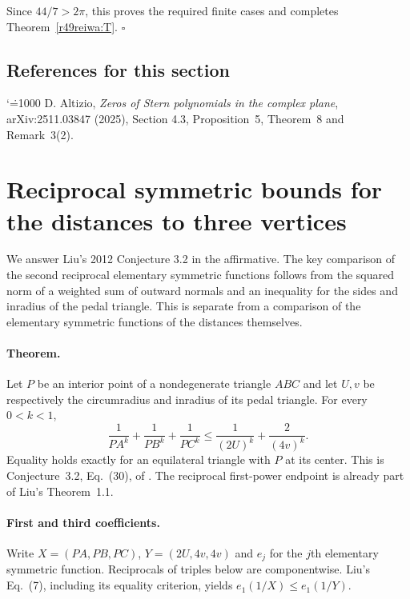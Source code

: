 \documentclass[11pt,a4paper]{article}
\makeatletter
\numberwithin{equation}{section}
\theoremstyle{definition}
\theoremstyle{remark}
\newenvironment{sectionabstract}{\par\smallskip\begingroup\small\noindent}{\par\endgroup\medskip}
\renewenvironment{thebibliography}[1]
 {\subsection*{References for this section}\small
  \list{\@biblabel{\@arabic\c@enumiv}}
       {\settowidth\labelwidth{\@biblabel{#1}}\leftmargin\labelwidth
        \advance\leftmargin\labelsep\@openbib@code
        \usecounter{enumiv}\let\p@enumiv\@empty
        \renewcommand\theenumiv{\@arabic\c@enumiv}}
  \sloppy\clubpenalty4000\widowpenalty4000\sfcode`\.=1000\relax}
 {\def\@noitemerr{\@latex@warning{Empty bibliography}}\endlist}
\makeatother
\begin{document}
Since \(44/7>2\pi\), this proves the required finite cases and completes Theorem~\ref{r49reiwa:T}. \hfill\(\square\)

\begin{thebibliography}{1}
 D. Altizio, \emph{Zeros of Stern polynomials in the complex plane}, arXiv:2511.03847 (2025), Section 4.3, Proposition~5, Theorem~8 and Remark~3(2).
\end{thebibliography}

\par\endgroup

\begingroup

\section{\texorpdfstring{Reciprocal symmetric bounds for the distances to three vertices}{Reciprocal symmetric bounds for the distances to three vertices}}\label{section:r50meiji}
\par\medskip

\begin{sectionabstract}
We answer Liu's 2012 Conjecture 3.2 in the affirmative. The key comparison of the second reciprocal elementary symmetric functions follows from the squared norm of a weighted sum of outward normals and an inequality for the sides and inradius of the pedal triangle. This is separate from a comparison of the elementary symmetric functions of the distances themselves.
\end{sectionabstract}
\paragraph{Theorem.}
Let $P$ be an interior point of a nondegenerate triangle $ABC$ and let $U,v$ be respectively the circumradius and inradius of its pedal triangle. For every $0<k<1$,
\[
 \frac1{PA^k}+\frac1{PB^k}+\frac1{PC^k}
 \le\frac1{(2U)^k}+\frac2{(4v)^k}.
\]
Equality holds exactly for an equilateral triangle with $P$ at its center. This is Conjecture~3.2, Eq.~(30), of \cite{r50meiji:liu}. The reciprocal first-power endpoint is already part of Liu's Theorem~1.1.

\paragraph{First and third coefficients.}
Write $X=(PA,PB,PC)$, $Y=(2U,4v,4v)$ and $e_j$ for the $j$th elementary symmetric function. Reciprocals of triples below are componentwise. Liu's Eq.~(7), including its equality criterion, yields $e_1(1/X)\le e_1(1/Y)$.
\end{document}
